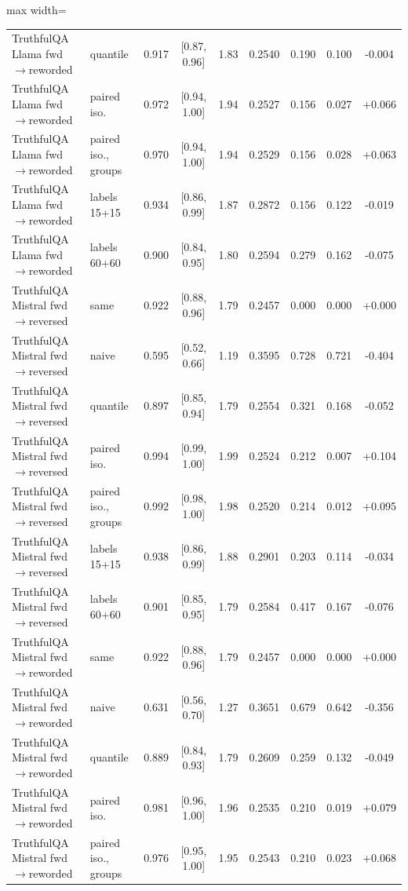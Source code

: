 \documentclass[twoside]{article}
\theoremstyle{definition}
\theoremstyle{remark}
\newcommand{\1}{\mathbf{1}}
\begin{document}
\begin{table}[t]
\begin{adjustbox}{max width=\textwidth}
\begin{tabular}{llccccccc}
TruthfulQA Llama fwd$\to$reworded & quantile & 0.917 & [0.87, 0.96] & 1.83 & 0.2540 & 0.190 & 0.100 & -0.004\\
TruthfulQA Llama fwd$\to$reworded & paired iso. & 0.972 & [0.94, 1.00] & 1.94 & 0.2527 & 0.156 & 0.027 & +0.066\\
TruthfulQA Llama fwd$\to$reworded & paired iso., groups & 0.970 & [0.94, 1.00] & 1.94 & 0.2529 & 0.156 & 0.028 & +0.063\\
TruthfulQA Llama fwd$\to$reworded & labels 15+15 & 0.934 & [0.86, 0.99] & 1.87 & 0.2872 & 0.156 & 0.122 & -0.019\\
TruthfulQA Llama fwd$\to$reworded & labels 60+60 & 0.900 & [0.84, 0.95] & 1.80 & 0.2594 & 0.279 & 0.162 & -0.075\\
\midrule
TruthfulQA Mistral fwd$\to$reversed & same & 0.922 & [0.88, 0.96] & 1.79 & 0.2457 & 0.000 & 0.000 & +0.000\\
TruthfulQA Mistral fwd$\to$reversed & naive & 0.595 & [0.52, 0.66] & 1.19 & 0.3595 & 0.728 & 0.721 & -0.404\\
TruthfulQA Mistral fwd$\to$reversed & quantile & 0.897 & [0.85, 0.94] & 1.79 & 0.2554 & 0.321 & 0.168 & -0.052\\
TruthfulQA Mistral fwd$\to$reversed & paired iso. & 0.994 & [0.99, 1.00] & 1.99 & 0.2524 & 0.212 & 0.007 & +0.104\\
TruthfulQA Mistral fwd$\to$reversed & paired iso., groups & 0.992 & [0.98, 1.00] & 1.98 & 0.2520 & 0.214 & 0.012 & +0.095\\
TruthfulQA Mistral fwd$\to$reversed & labels 15+15 & 0.938 & [0.86, 0.99] & 1.88 & 0.2901 & 0.203 & 0.114 & -0.034\\
TruthfulQA Mistral fwd$\to$reversed & labels 60+60 & 0.901 & [0.85, 0.95] & 1.79 & 0.2584 & 0.417 & 0.167 & -0.076\\
\midrule
TruthfulQA Mistral fwd$\to$reworded & same & 0.922 & [0.88, 0.96] & 1.79 & 0.2457 & 0.000 & 0.000 & +0.000\\
TruthfulQA Mistral fwd$\to$reworded & naive & 0.631 & [0.56, 0.70] & 1.27 & 0.3651 & 0.679 & 0.642 & -0.356\\
TruthfulQA Mistral fwd$\to$reworded & quantile & 0.889 & [0.84, 0.93] & 1.79 & 0.2609 & 0.259 & 0.132 & -0.049\\
TruthfulQA Mistral fwd$\to$reworded & paired iso. & 0.981 & [0.96, 1.00] & 1.96 & 0.2535 & 0.210 & 0.019 & +0.079\\
TruthfulQA Mistral fwd$\to$reworded & paired iso., groups & 0.976 & [0.95, 1.00] & 1.95 & 0.2543 & 0.210 & 0.023 & +0.068\\

\end{tabular}
\end{adjustbox}
\end{table}
\end{document}
